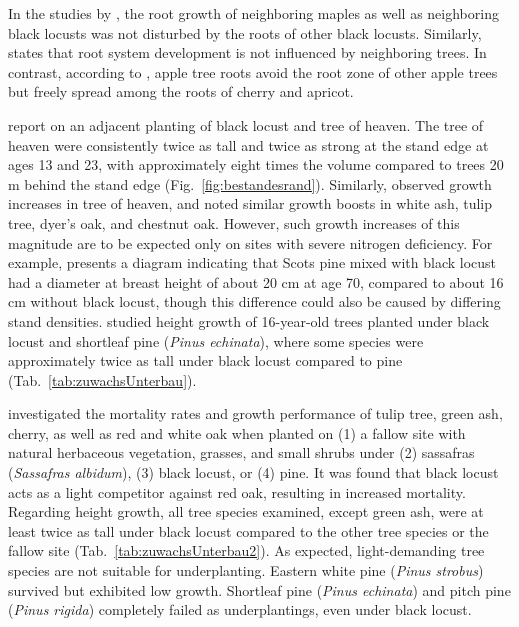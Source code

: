 In the studies by \citet[pp.~150--160]{scamoni1952robinieWurzeln}, the root growth of neighboring maples as well as neighboring black locusts was not disturbed by the roots of other black locusts. Similarly, \citet{bencat1992robinie} states that root system development is not influenced by neighboring trees. In contrast, according to \citet[p.~53]{kolesnikov1971wurzeln}, apple tree roots avoid the root zone of other apple trees but freely spread among the roots of cherry and apricot.

\citet{ferguson1922robinie,mcintyre1932robinie,chapman1935robinie} report on an adjacent planting of black locust and tree of heaven. The tree of heaven were consistently twice as tall and twice as strong at the stand edge at ages 13 and 23, with approximately eight times the volume compared to trees 20 m behind the stand edge (Fig.~\ref{fig:bestandesrand}). Similarly, \citet{mcintyre1932robinie} observed growth increases in tree of heaven, and \citet{chapman1935robinie} noted similar growth boosts in white ash, tulip tree, dyer’s oak, and chestnut oak. However, such growth increases of this magnitude are to be expected only on sites with severe nitrogen deficiency. For example, \citet[p.~107]{krauss1986sauenerWald} presents a diagram indicating that Scots pine mixed with black locust had a diameter at breast height of about 20 cm at age 70, compared to about 16 cm without black locust, though this difference could also be caused by differing stand densities. \citet{ashby1986robinieWuchssteigerung} studied height growth of 16-year-old trees planted under black locust and shortleaf pine (\emph{Pinus echinata}), where some species were approximately twice as tall under black locust compared to pine (Tab.~\ref{tab:zuwachsUnterbau}).


\citet{chapman1951robinieSchirm} investigated the mortality rates and growth performance of tulip tree, green ash, cherry, as well as red and white oak when planted on (1) a fallow site with natural herbaceous vegetation, grasses, and small shrubs under (2) sassafras (\emph{Sassafras albidum}), (3) black locust, or (4) pine. It was found that black locust acts as a light competitor against red oak, resulting in increased mortality. Regarding height growth, all tree species examined, except green ash, were at least twice as tall under black locust compared to the other tree species or the fallow site (Tab.~\ref{tab:zuwachsUnterbau2}). As expected, light-demanding tree species are not suitable for underplanting. Eastern white pine (\emph{Pinus strobus}) survived but exhibited low growth. Shortleaf pine (\emph{Pinus echinata}) and pitch pine (\emph{Pinus rigida}) completely failed as underplantings, even under black locust.

